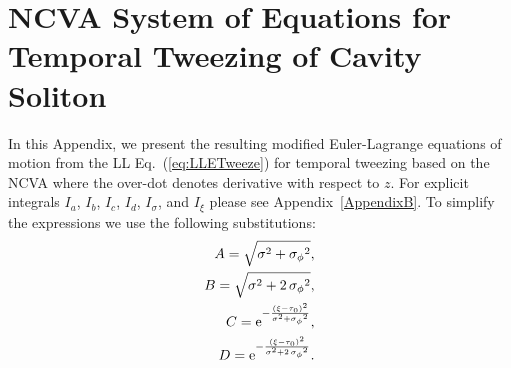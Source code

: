 \section{NCVA System of Equations for Temporal Tweezing of Cavity Soliton} %
\label{AppendixA} %

In this Appendix, we present the resulting modified Euler-Lagrange equations of motion from the LL Eq.~(\ref{eq:LLETweeze}) for temporal tweezing based on the NCVA where the over-dot denotes derivative with respect to $z$.  For explicit integrals $I_a$, $I_b$, $I_c$, $I_d$, $I_{\sigma}$, and $I_{\xi}$ please see Appendix~\ref{AppendixB}.  To simplify the expressions we use the following substitutions:
\begin{align}
A= \sqrt {{\sigma}^{2}+{{ \sigma_{\phi}}}^{2}}, \\
B= \sqrt {{\sigma}^{2}+2\,{{ \sigma_{\phi}}}^{2}},\\
C = {{\rm e}^{-{\frac { \left( { \xi}-{ \tau_0} \right) ^{2}}{{\sigma}^{2}+{{ \sigma_{\phi}}}^{2}}}}},\\
D = {{\rm e}^{-{\frac {\left( { \xi}-{ \tau_0} \right) ^{2}}{{\sigma}^{2}+2\,{{ \sigma_{\phi}}}^{2}}}}}.
\end{align}


